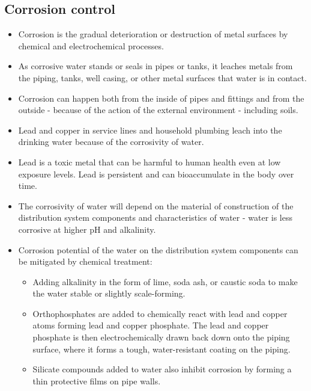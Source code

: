 \subsection{Corrosion control}
\begin{itemize}
\item Corrosion is the gradual deterioration or destruction of metal surfaces by chemical and electrochemical processes.
\item As corrosive water stands or seals in pipes or tanks, it leaches metals from the piping, tanks, well casing, or other metal surfaces that water is in contact.
\item Corrosion can happen both from the inside of pipes and fittings and from the outside - because of the action of the external environment - including soils.
\item Lead and copper in service lines and household plumbing leach into the drinking water because of the corrosivity of water. 
\item Lead is a toxic metal that can be harmful to human health even at low exposure levels. Lead is persistent and can bioaccumulate in the body over time. 
\item The corrosivity of water will depend on the material of construction of the distribution system components and characteristics of water - water is less corrosive at higher pH and alkalinity.
\item Corrosion potential of the water on the distribution system components can be mitigated by chemical treatment:
\begin{itemize}
\item Adding alkalinity in the form of lime, soda ash, or caustic soda to make the water stable or slightly scale-forming. 
\item Orthophosphates are added to chemically react with lead and copper atoms forming lead and copper phosphate. The lead and copper phosphate is then electrochemically drawn back down onto the piping surface, where it forms a tough, water-resistant coating on the piping. 
\item Silicate compounds added to water also inhibit corrosion by forming a thin protective films on pipe walls.
\end{itemize}
\end{itemize}
